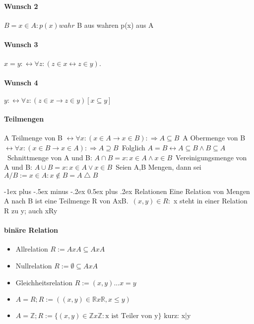 \documentclass[10pt,landscape]{article}
\makeatletter
\renewcommand{\section}{\@startsection{section}{1}{0mm}%
                                {-1ex plus -.5ex minus -.2ex}%
                                {0.5ex plus .2ex}%
                                {\normalfont\large\bfseries}}
\makeatother
\begin{document}
\begin{multicols}{3}
\paragraph{Wunsch 2}
$B={x\in A:p(x) wahr}$ B aus wahren p(x) aus A

\paragraph{Wunsch 3}
$x=y: \leftrightarrow \forall z:(z\in x \leftrightarrow z\in y)$.

\paragraph{Wunsch 4}
$y: \leftrightarrow \forall z:(z\in x \rightarrow z \in y) [x \subseteq y]$

\paragraph{Teilmengen}
A Teilmenge von B $\leftrightarrow \forall x: (x\in A \rightarrow x \in B):\Rightarrow A\subseteq B$\
A Obermenge von B $\leftrightarrow \forall x: (x\in B \rightarrow x \in A):\Rightarrow A\supseteq B$\
Folglich $A=B \leftrightarrow A\subseteq B \wedge B\subseteq A$\
Schnittmenge von A und B: $A\cap B = {x: x\in A \wedge x\in B}$\
Vereinigungsmenge von A und B: $A\cup B = {x: x\in A \vee x\in B}$\
Seien A,B Mengen, dann sei $A/B:={x\in A: x\not \in B } = A\bigtriangleup B$

\section{Relationen}
Eine Relation von Mengen A nach B ist eine Teilmenge R von AxB.\
$(x,y)\in R:$ x steht in einer Relation R zu y; auch xRy\

\paragraph{binäre Relation}
\begin{itemize}
    \item Allrelation $R:=AxA \subseteq AxA$
    \item Nullrelation $R:=\emptyset \subseteq AxA$
    \item Gleichheitsrelation $R:={(x,y)... x=y}$
    \item $A=R; R:=((x,y)\in \mathbb{R} x \mathbb{R}, x \leq y)$
    \item $A=\mathbb{Z}; R:=\{(x,y)\in \mathbb{Z} x \mathbb{Z}: \text{x ist Teiler von y} \}$ kurz: x|y
\end{itemize}


\end{multicols}
\end{document}
